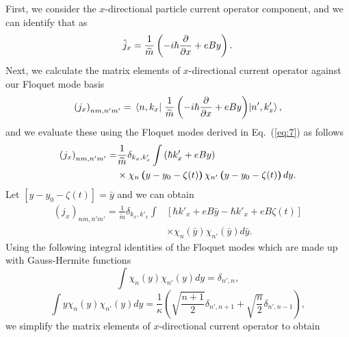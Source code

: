 \documentclass[
 reprint,
 amsmath,amssymb,
 aps,
 prb,
]{revtex4-2}
\begin{document}
{First, we consider the $x$-directional particle current operator component, and we can identify that as
\begin{equation} \label{eq:d4}
  \hat{j}_x = \frac{1}{\widetilde{m}} \left(-i\hbar\pdv{x} + eBy \right).
\end{equation}
Next, we calculate the matrix elements of $x$-directional current operator against our Floquet mode basis
\begin{equation} \label{eq:d5}
  \left({j}_x \right)_{nm,n'm'} =
  \mel{n,k_x}{\;\frac{1}{\widetilde{m}} \left(-i\hbar\pdv{x} + eBy \right)}{n',k'_x},
\end{equation}
and we evaluate these using the Floquet modes derived in Eq.~(\ref{eq:7}) as follows
\begin{equation} \label{eq:d6}
  \begin{aligned}
    \left({j}_x \right)_{nm,n'm'} = &
    \frac{1}{{\widetilde{m}}}
    \delta_{k_x,k'_x}
    \int
    \left(\hbar k'_x + eBy\right) \\
    & \times
     \chi_{n}\bm{\left(}y - y_0 - \zeta(t)\bm{\right)}
    \chi_{n'}\bm{\left(}y - y_0 - \zeta(t)\bm{\right)}
    dy.
  \end{aligned}
\end{equation}
Let $[y - y_0 - \zeta(t)] = \bar{y}$ and we can obtain
\begin{equation} \label{eq:d7}
  \begin{aligned}
    \left({j}_x \right)_{nm,n'm'} =
    \frac{1}{{\widetilde{m}}}
    \delta_{k_x,k'_x}
    \int &
    \left[ \hbar k'_x + eB\bar{y} -\hbar k'_x + eB\zeta(t)\right] \\
    & \times
    \chi_{n}(\bar{y})
    \chi_{n'}(\bar{y})
    d\bar{y}.
  \end{aligned}
\end{equation}
Using the following integral identities of the Floquet modes which are made up with Gauss-Hermite functions \cite{vedenyapin11,szego59,boyd18}
\begin{equation} \label{eq:d8}
  \int \chi_{n}({y})
  \chi_{n'}({y}) d{y} = \delta_{n',n},
\end{equation}
\begin{equation} \label{eq:d9}
    \int
    y \chi_{n}({y})\chi_{n'}({y}) d{y} =
    \frac{1}{\kappa}
    \left(\sqrt{\frac{n+1}{2}} \delta_{n',n+1} + \sqrt{\frac{n}{2}}
    \delta_{n',n-1} \right),
\end{equation}
we simplify the matrix elements of $x$-directional current operator to obtain
\begin{equation} \label{eq:d10}

\end{equation}}
\end{document}
